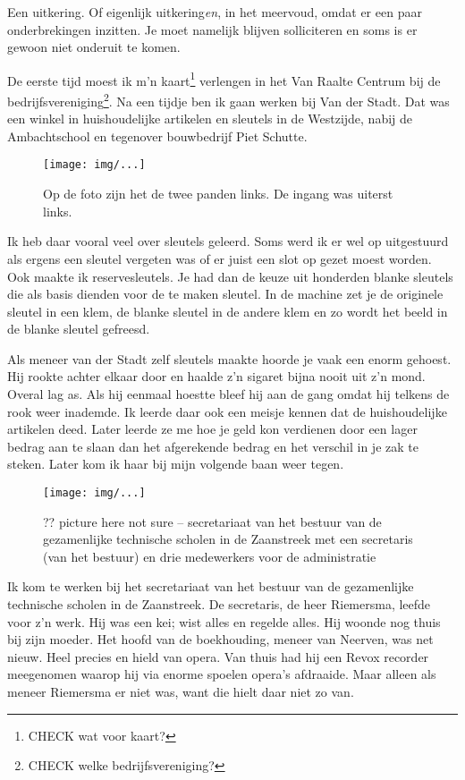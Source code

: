 \documentclass[10pt,twoside,openright]{memoir}
\begin{document}
Een uitkering. Of eigenlijk uitkering\emph{en}, in het meervoud, omdat er een paar onderbrekingen inzitten. Je moet namelijk blijven solliciteren en soms is er gewoon niet onderuit te komen. 

De eerste tijd moest ik m'n kaart\footnote{CHECK wat voor kaart?} verlengen in het Van Raalte Centrum bij de bedrijfsvereniging\footnote{CHECK welke bedrijfsvereniging?}. Na een tijdje ben ik gaan werken bij Van der Stadt. Dat was een winkel in huishoudelijke artikelen en sleutels in de Westzijde, nabij de Ambachtschool en tegenover bouwbedrijf Piet Schutte.

\begin{figure}[t]
\texttt{[image: img/...]}
\caption{Op de foto zijn het de twee panden links. De ingang was uiterst links.}
\end{figure}

Ik heb daar vooral veel over sleutels geleerd. Soms werd ik er wel op uitgestuurd als ergens een sleutel vergeten was of er juist een slot op gezet moest worden. Ook maakte ik reservesleutels. Je had dan de keuze uit honderden blanke sleutels die als basis dienden voor de te maken sleutel. In de machine zet je de originele sleutel in een klem, de blanke sleutel in de andere klem en zo wordt het beeld in de blanke sleutel gefreesd. 

Als meneer van der Stadt zelf sleutels maakte hoorde je vaak een enorm gehoest. Hij rookte achter elkaar door en haalde z’n sigaret bijna nooit uit z’n mond. Overal lag as. Als hij eenmaal hoestte bleef hij aan de gang omdat hij telkens de rook weer inademde. Ik leerde daar ook een meisje kennen dat de huishoudelijke artikelen deed. Later leerde ze me hoe je geld kon verdienen door een lager bedrag aan te slaan dan het afgerekende bedrag en het verschil in je zak te steken. Later kom ik haar bij mijn volgende baan weer tegen. 

\begin{figure}[t]
\texttt{[image: img/...]}
\caption{?? picture here not sure -- secretariaat van het bestuur van de gezamenlijke technische scholen in de Zaanstreek met een secretaris (van het bestuur) en drie medewerkers voor de administratie}
\end{figure}

Ik kom te werken bij het secretariaat van het bestuur van de gezamenlijke technische scholen in de Zaanstreek. De secretaris, de heer Riemersma, leefde voor z'n werk. Hij was een kei; wist alles en regelde alles. Hij woonde nog thuis bij zijn moeder. Het hoofd van de boekhouding, meneer van Neerven, was net nieuw. Heel precies en hield van opera. Van thuis had hij een Revox recorder meegenomen waarop hij via enorme spoelen opera's afdraaide. Maar alleen als meneer Riemersma er niet was, want die hielt daar niet zo van.
\end{document}
